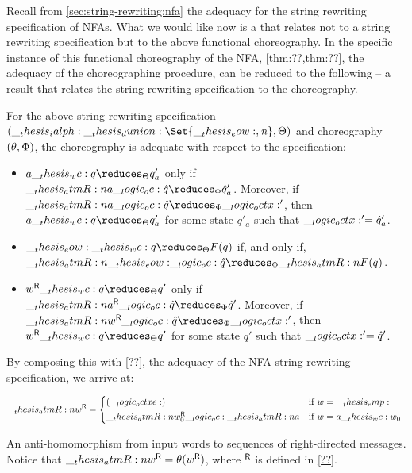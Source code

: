 Recall from \cref{sec:string-rewriting:nfa} the adequacy  for the string rewriting specification of \acp{NFA}.
%
\nfaadequacystringrewriting*
%
What we would like now is a  that relates  not to a string rewriting specification but to the above functional choreography.
In the specific instance of this functional choreography of the \ac{NFA}, \cref{thm:??,thm:??}, the adequacy of the choreographing procedure, can be reduced to the following  -- a result that relates the string rewriting specification to the choreography.
\begin{corollary}
  For the above string rewriting specification $(\ialph \dunion \Set{\eow, \symrej}, \srsig)$ and choreography $(\theta, \Phi)$, the choreography is adequate with respect to the specification:
  \begin{itemize}[nosep]
  \item
    $a \wc q \reduces_{\srsig} q'_a$ only if $\atmR{a} \oc \defp{q} \reduces_{\orsig} \defp{q}'_a$.
    Moreover, if $\atmR{a} \oc \defp{q} \reduces_{\orsig} \octx'$, then $a \wc q \reduces_{\srsig} q'_a$ for some state $q'_a$ such that $\__logic_octx:' = \hat{q}'_a$.
  \item
    $\eow \wc q \reduces_{\srsig} F(q)$ if, and only if, $\atmR{\eow} \oc \defp{q} \reduces_{\orsig} \atmR{F}(q)$.
  \item
    $\rev{w} \wc q \reduces_{\srsig} q'$ only if $\rev{\atmR{a}} \oc \defp{q} \reduces_{\orsig} \defp{q}'$.
    Moreover, if $\rev{\atmR{w}} \oc \defp{q} \reduces_{\orsig} \octx'$, then $\rev{w} \wc q \reduces_{\srsig} q'$ for some state $q'$ such that $\__logic_octx:' = \hat{q}'$.
  \end{itemize}
\end{corollary}
%
\noindent By composing this with \cref{??}, the adequacy of the \ac{NFA} string rewriting specification, we arrive at:
%
\begin{marginfigure}
  \begin{equation*}
    \rev{\atmR{w}} =
      \begin{cases*}
        (\octxe) & if $w = \emp$ \\
        \rev{\atmR{w}_0} \oc \atmR{a} & if $w = a \wc w_0$
      \end{cases*}
  \end{equation*}
  \caption{An anti-homomorphism from input words to sequences of right-directed messages.
    Notice that $\rev{\atmR{w}} = \theta(\rev{w})$, where $\rev{}$ is defined in \cref{??}.}\label{fig:formula-as-process:msg-rev}
\end{marginfigure}%
